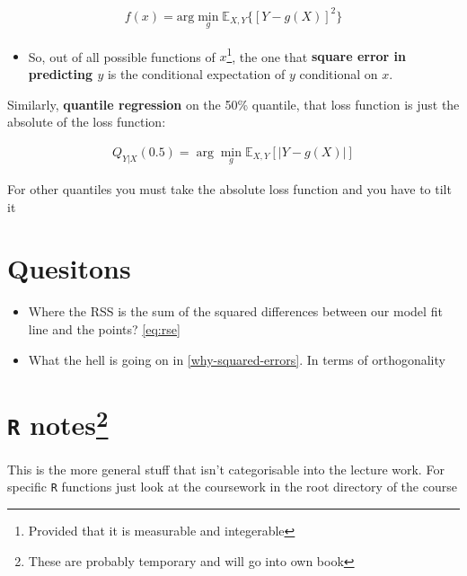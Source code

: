 \documentclass[
]{report}
\providecommand{\tightlist}{%
  \setlength{\itemsep}{0pt}\setlength{\parskip}{0pt}}
\renewenvironment{quote}{
	\bigskip\begin{mdframed}[
			skipabove=\topskip,
			skipbelow=\topskip,
			backgroundcolor=quoteshadecolor,
			leftmargin=0.5cm,
			rightmargin=0.5cm,
			topline=false,
			rightline=false,
			bottomline=false,
			nobreak=true,
		]\itshape%
		}{
	\end{mdframed}
}
\theoremstyle{definition}
\theoremstyle{definition}
\theoremstyle{definition}
\theoremstyle{definition}
\theoremstyle{remark}
\begin{document}
\begin{align*}
  f(x) = \text{arg}\underset{g}\min \mathbb{E}_{X,Y}\{ [ Y - g(X) ]^2 \}
\end{align*}

\begin{itemize}
\tightlist
\item
  So, out of all possible functions of \(x\)\footnote{Provided that it is measurable and
    integerable}, the one that \textbf{square error in predicting \(y\)} is the
  conditional expectation of \(y\) conditional on \(x\).
\end{itemize}

Similarly, \textbf{quantile regression} on the 50\% quantile, that loss function is
just the absolute of the loss function:

\begin{align*}
  Q_{Y|X}(0.5) = \arg \min_g \mathbb E_{X,Y} [ |Y - g(X)| ]
\end{align*}

\begin{quote}
For other quantiles you must take the absolute loss function and you have to
tilt it
\end{quote}

\hypertarget{quesitons}{%
\chapter{Quesitons}\label{quesitons}}

\begin{itemize}
\tightlist
\item
  Where the RSS is the sum of the squared differences between our model fit
  line and the points? \eqref{eq:rse}
\item
  What the hell is going on in \ref{why-squared-errors}. In terms of
  orthogonality
\end{itemize}

\hypertarget{r-notes}{%
\chapter[\texttt{R} notes]{\texorpdfstring{\texttt{R} notes\footnote{These are probably temporary and will go into own book}}{R notes}}\label{r-notes}}

\begin{quote}
This is the more general stuff that isn't categorisable into the lecture
work. For specific \texttt{R} functions just look at the coursework in the root
directory of the course
\end{quote}
\end{document}
